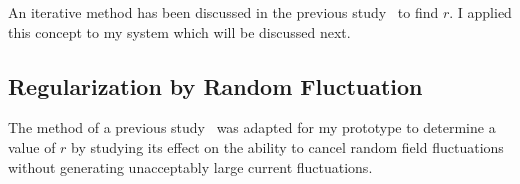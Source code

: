 An iterative method has been discussed in the previous study~\cite{bea} to find $r$. I applied this concept to my system which will be discussed next.











\subsection{Regularization by Random Fluctuation}\label{sec:mont}

The method of a previous study~\cite{bea} was adapted for my prototype to determine a value of $r$ by studying its effect on the ability to cancel random field fluctuations without generating unacceptably large current fluctuations.

